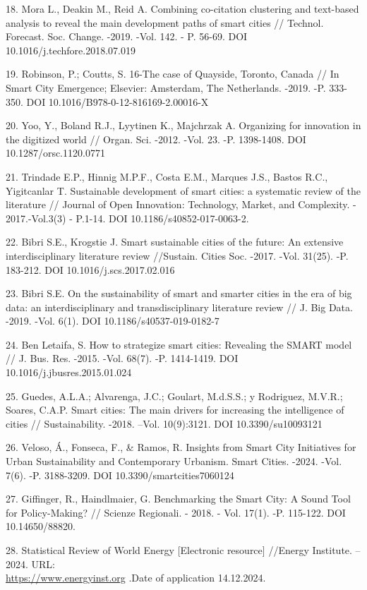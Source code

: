 \begin{references}
18. Mora L., Deakin M., Reid A. Combining co-citation clustering and
text-based analysis to reveal the main development paths of smart
cities // Technol. Forecast. Soc. Change. -2019. -Vol. 142. - P.
56-69. DOI 10.1016/j.techfore.2018.07.019

19. Robinson, P.; Coutts, S. 16-The case of Quayside, Toronto, Canada //
In Smart City Emergence; Elsevier: Amsterdam, The Netherlands. -2019.
-P. 333-350. DOI 10.1016/B978-0-12-816169-2.00016-X

20. Yoo, Y., Boland R.J., Lyytinen K., Majchrzak A. Organizing for
innovation in the digitized world // Organ. Sci. -2012. -Vol. 23. -P.
1398-1408. DOI 10.1287/orsc.1120.0771

21. Trindade E.P., Hinnig M.P.F., Costa E.M., Marques J.S., Bastos R.C.,
Yigitcanlar T. Sustainable development of smart cities: a systematic
review of the literature // Journal of Open Innovation: Technology,
Market, and Complexity. - 2017.-Vol.3(3) - P.1-14.
DOI 10.1186/s40852-017-0063-2.

22. Bibri S.E., Krogstie J. Smart sustainable cities of the future: An
extensive interdisciplinary literature review //Sustain. Cities Soc.
-2017. -Vol. 31(25). -P. 183-212.
DOI 10.1016/j.scs.2017.02.016

23. Bibri S.E. On the sustainability of smart and smarter cities in the
era of big data: an interdisciplinary and transdisciplinary literature
review // J. Big Data. -2019. -Vol. 6(1). DOI
10.1186/s40537-019-0182-7

24. Ben Letaifa, S. How to strategize smart cities: Revealing the SMART
model // J. Bus. Res. -2015. -Vol. 68(7). -P. 1414-1419. DOI
10.1016/j.jbusres.2015.01.024

25. Guedes, A.L.A.; Alvarenga, J.C.; Goulart, M.d.S.S.; y Rodriguez,
M.V.R.; Soares, C.A.P. Smart cities: The main drivers for increasing
the intelligence of cities // Sustainability. -2018. --Vol.
10(9):3121. DOI 10.3390/su10093121

26. Veloso, Á., Fonseca, F., \& Ramos, R. Insights from Smart City
Initiatives for Urban Sustainability and Contemporary Urbanism. Smart
Cities. -2024. -Vol. 7(6). -P. 3188-3209. DOI
10.3390/smartcities7060124

27. Giffinger, R., Haindlmaier, G. Benchmarking the Smart City: A Sound
Tool for Policy-Making? // Scienze Regionali. - 2018. - Vol. 17(1).
-P. 115-122. DOI 10.14650/88820.

28. Statistical Review of World Energy {[}Electronic resource{]} //Energy
Institute. -- 2024. URL: \\\href{https://www.energyinst.org/statistical-review}{https://www.energyinst.org}
.Date of application 14.12.2024.
\end{references}

